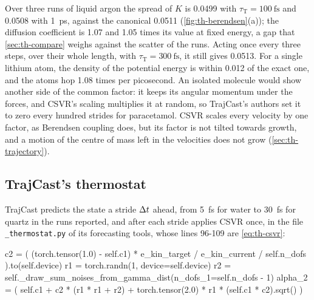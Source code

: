Over three runs of liquid argon the spread of $K$ is 0.0499 with
$\tau_{\mathrm T} = \SI{100}{\femto\second}$ and 0.0508 with
\SI{1}{\pico\second}, against the canonical 0.0511
(\cref{fig:th-berendsen}(a)); the diffusion coefficient is 1.07 and 1.05
times its value at fixed energy, a gap that \cref{sec:th-compare} weighs
against the scatter of the runs.
Acting once every three steps, over their whole length, with
$\tau_{\mathrm T} = \SI{300}{\femto\second}$, it still gives 0.0513.
For a single lithium atom, the density of the potential energy is within
0.012 of the exact one, and the atoms hop 1.08 times per picosecond. An
isolated molecule would show another side of the common factor: it keeps
its angular momentum under the forces, and CSVR's scaling multiplies it
at random, so TrajCast's authors set it to zero every hundred strides for
paracetamol\cite{Thiemann2026}.
CSVR scales every velocity by one factor, as Berendsen coupling does, but
its factor is not tilted towards growth\cite{Braun2018}, and a motion of
the centre of mass left in the velocities does not grow
(\cref{sec:th-trajectory}).

\subsection*{TrajCast's thermostat}

TrajCast predicts the state a stride $\Delta t$ ahead, from
\SI{5}{\femto\second} for water to \SI{30}{\femto\second} for quartz in
the runs reported, and after each stride applies CSVR once, in the
file \texttt{\_thermostat.py} of its forecasting tools\cite{Thiemann2026},
whose lines 96-109 are \cref{eq:th-csvr}:

\begin{code}
        c2 = (
            (torch.tensor(1.0) - self.c1) * e_kin_target
            / e_kin_current / self.n_dofs
        ).to(self.device)
        r1 = torch.randn(1, device=self.device)
        r2 = self._draw_sum_noises_from_gamma_dist(n_dofs_1=self.n_dofs - 1)
        alpha_2 = (
            self.c1
            + c2 * (r1 * r1 + r2)
            + torch.tensor(2.0) * r1 * (self.c1 * c2).sqrt()
        )
\end{code}

